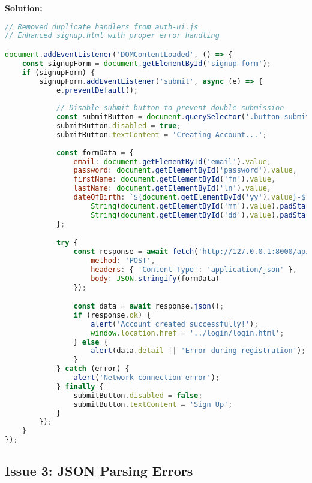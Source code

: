 \documentclass[12pt,a4paper]{article}
\begin{document}
\textbf{Solution:}
\begin{lstlisting}[language=JavaScript, caption=Fixed Signup Handler]
// Removed duplicate handlers from auth-ui.js
// Enhanced signup.html with proper error handling

document.addEventListener('DOMContentLoaded', () => {
    const signupForm = document.getElementById('signup-form');
    if (signupForm) {
        signupForm.addEventListener('submit', async (e) => {
            e.preventDefault();
            
            // Disable submit button to prevent double submission
            const submitButton = document.querySelector('.button-submit');
            submitButton.disabled = true;
            submitButton.textContent = 'Creating Account...';
            
            const formData = {
                email: document.getElementById('email').value,
                password: document.getElementById('password').value,
                firstName: document.getElementById('fn').value,
                lastName: document.getElementById('ln').value,
                dateOfBirth: `${document.getElementById('yy').value}-${
                    String(document.getElementById('mm').value).padStart(2, '0')}-${
                    String(document.getElementById('dd').value).padStart(2, '0')}`
            };

            try {
                const response = await fetch('http://127.0.0.1:8000/api/signup', {
                    method: 'POST',
                    headers: { 'Content-Type': 'application/json' },
                    body: JSON.stringify(formData)
                });

                const data = await response.json();
                if (response.ok) {
                    alert('Account created successfully!');
                    window.location.href = '../login/login.html';
                } else {
                    alert(data.detail || 'Error during registration');
                }
            } catch (error) {
                alert('Network connection error');
            } finally {
                submitButton.disabled = false;
                submitButton.textContent = 'Sign Up';
            }
        });
    }
});
\end{lstlisting}

\subsection{Issue 3: JSON Parsing Errors}
\end{document}
